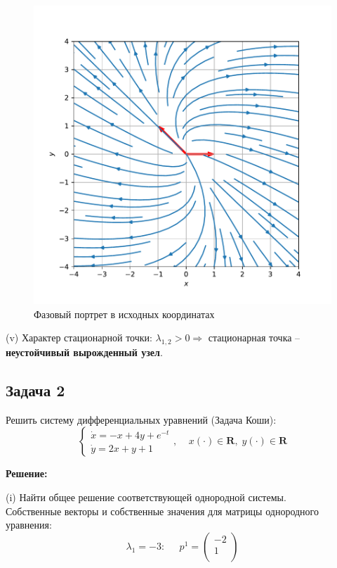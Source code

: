 \documentclass[a4paper, 12pt]{article}
\begin{document}
\begin{figure}[H]
	\centering
	\includegraphics[scale=0.8]{1b1_1}
	\caption{Фазовый портрет в исходных координатах}
	\label{im:1b1_1}
\end{figure}
(v) Характер стационарной точки: $\lambda_{1,2}>0 \Rightarrow$ стационарная точка -- \textbf{неустойчивый вырожденный узел}.

	\subsection {Задача 2}
 Решить систему дифференциальных уравнений (Задача Коши): 
\begin{equation}
\left\{
\begin{array}{lr}
\dot{x} = -x+4y+e^{-t}\\
\dot{y} = 2x+y+1
\end{array}
\right.
, \;\;\;\; x(\cdot)\in \textbf{R},\; y(\cdot)\in \textbf{R}
\label{eq:23}
\end{equation}

\textbf{Решение:} \par


(i) Найти общее решение соответствующей однородной системы.\\

Собственные векторы и собственные значения для матрицы однородного уравнения:
\[\lambda_1 = -3:\;\;\;\;\; p^1=
\left(
\begin{array}{cc}
-2\\
1\\
\end{array}
\right)  
\]
\end{document}
